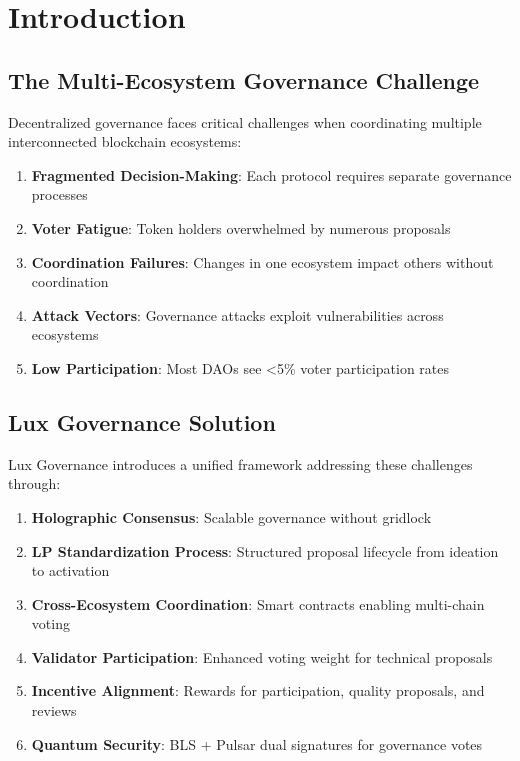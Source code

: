 \section{Introduction}


\subsection{The Multi-Ecosystem Governance Challenge}

Decentralized governance faces critical challenges when coordinating multiple interconnected blockchain ecosystems:

\begin{enumerate}
\item \textbf{Fragmented Decision-Making}: Each protocol requires separate governance processes
\item \textbf{Voter Fatigue}: Token holders overwhelmed by numerous proposals
\item \textbf{Coordination Failures}: Changes in one ecosystem impact others without coordination
\item \textbf{Attack Vectors}: Governance attacks exploit vulnerabilities across ecosystems
\item \textbf{Low Participation}: Most DAOs see <5\% voter participation rates
\end{enumerate}

\subsection{Lux Governance Solution}

Lux Governance introduces a unified framework addressing these challenges through:

\begin{enumerate}
\item \textbf{Holographic Consensus}: Scalable governance without gridlock
\item \textbf{LP Standardization Process}: Structured proposal lifecycle from ideation to activation
\item \textbf{Cross-Ecosystem Coordination}: Smart contracts enabling multi-chain voting
\item \textbf{Validator Participation}: Enhanced voting weight for technical proposals
\item \textbf{Incentive Alignment}: Rewards for participation, quality proposals, and reviews
\item \textbf{Quantum Security}: BLS + Pulsar dual signatures for governance votes
\end{enumerate}

